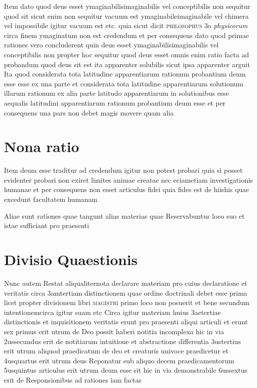 \documentclass[twoside, openright]{report}
\newcommand{\name}[1]{\textsc{#1}}
\newcommand{\worktitle}[1]{\textit{#1}}
\begin{document}
        \pstart
        Item dato quod deus esset ymaginabilisimaginabilis vel conceptibilis non sequitur quod sit sicut enim non sequitur vacuum est ymaginabileimaginabile vel chimera vel impossibile igitur vacuum est etc. quia sicut dicit \name{philosophus} 3o \worktitle{physicorum}\index[works]{} circa finem ymaginatum non est credendum et per consequens dato quod primae rationes vero concluderent quin deus esset ymaginabilisimaginabilis vel conceptibilis non propter hoc sequitur quod deus esset omnis enim ratio facta ad probandum quod deus sit est ita apparenter solubilis sicut ipsa apparenter arguit Ita quod considerata tota latitudine apparentiarum rationum probantium deum esse esse ex una parte et considerata tota latitudine apparentiarum solutionum illarum rationum ex alia parte latitudo apparentiarum in solutionibus esse aequalis latitudini apparentiarum rationum probantium deum esse et per consequens una pars non debet magis movere quam alia
        \pend
      
        \bigskip
         \section*{Nona ratio} 
        \pstart
        Item deum esse traditur ad credendum igitur non potest probari quia si posset evidenter probari non exiret limites animae creatae nec eciametiam investigationis humanae et per consequens non esset articulus fidei quia fides est de hiishis quae excedunt facultatem humanam
        \pend
      
        \bigskip
         
        \pstart
        Aliae sunt rationes quae tangunt alias materias quae Reservabuntur loco suo et istae sufficiant pro praesenti
        \pend
       
        \bigskip
         \section*{Divisio Quaestionis} 
        \pstart
        Nunc autem Restat aliqualiternota declarare materiam pro cuius declaratione et veritatis circa 3amtertiam distinctionem quae ordine doctrinali debet esse prima licet propter divisionem libri \name{magistri} primo loco non posuerit et bene secundum intentionemcirca igitur suam etc   Circa igitur materiam huius 3aetertiae distinctionis et inquisitionem veritatis erunt pro praesenti aliqui articuli et erunt sex primus erit utrum de Deo possit haberi notitia incomplexa hic in via 2ussecundus erit de notitiarum intuitione et abstractione differentia 3ustertius erit utrum aliquod praedicatum de deo et creaturis univoce praedicetur et 4usquartus erit utrum deus Reponatur sub aliquo decem praedicamentorum 5usquintus articulus erit utrum deum esse sit hic in via demonstrabile 6ussextus erit de Responsionibus ad rationes iam factas
        \pend
      
\end{document}
